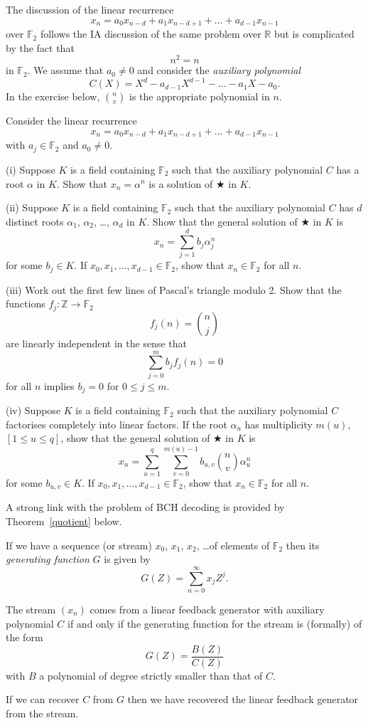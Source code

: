 The discussion of the linear recurrence
\[x_{n}=a_{0}x_{n-d}+a_{1}x_{n-d+1}+\dots+a_{d-1}x_{n-1}\]
over ${\mathbb F}_{2}$ follows the IA discussion
of the same problem over ${\mathbb R}$ but
is complicated by the fact that
\[n^{2}=n\]
in ${\mathbb F}_{2}$. We assume that $a_{0}\neq 0$
and consider the \emph{auxiliary polynomial}
\[C(X)=X^{d}-a_{d-1}X^{d-1}-\dots-a_{1}X-a_{0}.\]
In the exercise below, ${\displaystyle \binom{n}{v}}$
is the appropriate polynomial in $n$.
\begin{exercise}\label{Solve recurrence}
Consider the linear recurrence
\begin{equation*}
x_{n}=a_{0}x_{n-d}+a_{1}x_{n-d+1}+\ldots+a_{d-1}x_{n-1}\tag*{$\bigstar$}
\end{equation*}
with $a_{j}\in {\mathbb F}_{2}$ and $a_{0}\neq 0$.

(i) Suppose $K$ is a field containing ${\mathbb F}_{2}$
such that the auxiliary polynomial $C$ has a root $\alpha$
in $K$. Show that $x_{n}=\alpha^{n}$ is a solution of $\bigstar$ in $K$.

(ii) Suppose $K$ is a field containing ${\mathbb F}_{2}$
such that the auxiliary polynomial $C$ has
$d$ distinct roots $\alpha_{1}$, $\alpha_{2}$,
\dots, $\alpha_{d}$ in $K$. Show that the general solution
of $\bigstar$ in $K$ is
\[x_{n}=\sum_{j=1}^{d}b_{j}\alpha_{j}^{n}\]
for some $b_{j}\in K$.
If $x_{0},x_{1},\dots,x_{d-1}\in {\mathbb F}_{2}$,
show that $x_{n}\in {\mathbb F}_{2}$ for all $n$.

(iii) Work out the first few lines of Pascal's triangle
modulo 2. Show that the functions
$f_{j}:{\mathbb Z}\rightarrow{\mathbb F}_{2}$
\[f_{j}(n)=\binom{n}{j}\]
are linearly independent in the sense that
\[\sum_{j=0}^{m}b_{j}f_{j}(n)=0\]
for all $n$ implies $b_{j}=0$ for $0\leq j\leq m$.

(iv) Suppose $K$ is a field containing ${\mathbb F}_{2}$
such that the auxiliary polynomial $C$ factorises
completely into linear factors. If the
root $\alpha_{u}$ has multiplicity $m(u)$, $[1\leq u\leq q]$,
show that the general solution
of $\bigstar$ in $K$ is
\[x_{n}=\sum_{u=1}^{q}\sum_{v=0}^{m(u)-1}
b_{u,v}\binom{n}{v}\alpha_{u}^{n}\]
for some $b_{u,v}\in K$.
If $x_{0},x_{1},\dots,x_{d-1}\in {\mathbb F}_{2}$,
show that $x_{n}\in {\mathbb F}_{2}$ for all $n$.
\end{exercise}

A strong link with the problem of BCH decoding
is provided by Theorem~\ref{quotient} below.
\begin{definition}
If we have a sequence (or stream) $x_{0}$, $x_{1}$,
$x_{2}$, \dots of elements of ${\mathbb F}_{2}$ then
its \emph{generating function} $G$ is given by
\[G(Z)=\sum_{n=0}^{\infty}x_{j}Z^{j}.\]
\end{definition}
\begin{theorem}\label{quotient} The stream $(x_{n})$
comes from a linear feedback generator with
auxiliary polynomial $C$ if and only if
the generating function for the stream is (formally)
of the form
\[G(Z)=\frac{B(Z)}{C(Z)}\]
with $B$ a polynomial of degree strictly smaller than that
of $C$.
\end{theorem}
\noindent
If we can recover $C$ from $G$ then we have recovered
the linear feedback generator from the stream.

